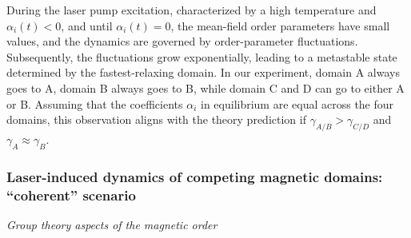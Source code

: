 During the laser pump excitation, characterized by a high temperature and $\alpha_i(t)<0$, and until $\alpha_i(t)=0$, the mean-field order parameters have small values, and the dynamics are governed by order-parameter fluctuations.
Subsequently, the fluctuations grow exponentially, leading to a metastable state determined by the fastest-relaxing domain.
In our experiment, domain A always goes to A, domain B always goes to B, while domain C and D can go to either A or B.
Assuming that the coefficients $\alpha_i$ in equilibrium are equal across the four domains, this observation aligns with the theory prediction if $\gamma_{A/B} > \gamma_{C/D}$ and $\gamma_A \approx \gamma_B$.

\subsubsection{Laser-induced dynamics of competing magnetic domains: ``coherent'' scenario}\label{sec:nonequilibriumtheory}

\textit{Group theory aspects of the magnetic order}

